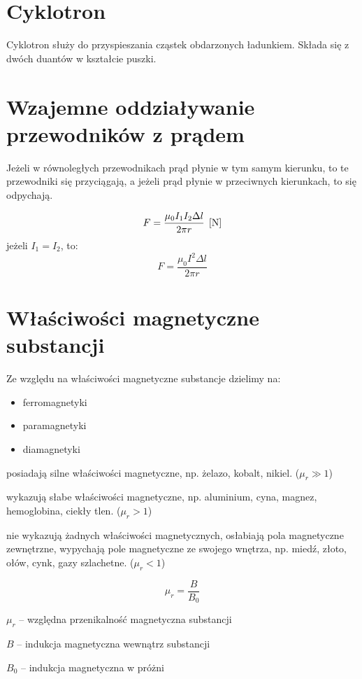 \section{Cyklotron}
Cyklotron służy do przyspieszania cząstek obdarzonych ładunkiem. Składa się z dwóch duantów w
kształcie puszki.

\section{Wzajemne oddziaływanie przewodników z prądem}
Jeżeli w równoległych przewodnikach prąd płynie w tym samym kierunku, to te przewodniki się
przyciągają, a jeżeli prąd płynie w przeciwnych kierunkach, to się odpychają.

\begin{equation*}
  F = \frac{\mu_0 I_1 I_2 \Delta l}{2\pi r} \;\left[\mathrm{N}\right]
\end{equation*}
jeżeli $I_1 = I_2$, to:
\begin{equation*}
  F = \frac{\mu_0 I^2 \Delta l}{2\pi r}
\end{equation*}

\section{Właściwości magnetyczne substancji}
Ze względu na właściwości magnetyczne substancje dzielimy na:
\begin{itemize}
  \item ferromagnetyki
  \item paramagnetyki
  \item diamagnetyki
\end{itemize}

 posiadają silne właściwości magnetyczne, np. żelazo, kobalt, nikiel. ($\mu_r \gg 1$)

 wykazują słabe właściwości magnetyczne, np. aluminium, cyna, magnez,
hemoglobina, ciekły tlen. ($\mu_r > 1$)

 nie wykazują żadnych właściwości magnetycznych, osłabiają pola magnetyczne
zewnętrzne, wypychają pole magnetyczne ze swojego wnętrza, np. miedź, złoto, ołów, cynk, gazy
szlachetne. ($\mu_r < 1$)

\begin{equation*}
  \mu_r = \frac{B}{B_0}
\end{equation*}
\begin{symbols}
  \item $\mu_r$ -- względna przenikalność magnetyczna substancji
  \item $B$ -- indukcja magnetyczna wewnątrz substancji
  \item $B_0$  -- indukcja magnetyczna w próżni
\end{symbols}

